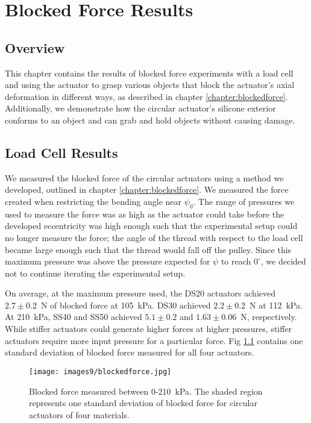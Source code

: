 \chapter{Blocked Force Results}

\section*{Overview}

This chapter contains the results of blocked force experiments with a load cell and using the actuator to grasp various objects that block the actuator's axial deformation in different ways, as described in chapter \ref{chapter:blockedforce}. Additionally, we demonstrate how the circular actuator's silicone exterior conforms to an object and can grab and hold objects without causing damage.

\section{Load Cell Results}

We measured the blocked force of the circular actuators using a method we developed, outlined in chapter \ref{chapter:blockedforce}. We measured the force created when restricting the bending angle near $\psi_0$. The range of pressures we used to measure the force was as high as the actuator could take before the developed eccentricity was high enough such that the experimental setup could no longer measure the force; the angle of the thread with respect to the load cell became large enough such that the thread would fall off the pulley. Since this maximum pressure was above the pressure expected for $\psi$ to reach $0^\circ$, we decided not to continue iterating the experimental setup. 

On average, at the maximum pressure used, the DS20 actuators achieved $2.7\pm0.2$~N of blocked force at 105~kPa. DS30 achieved $2.2\pm0.2$~N at 112~kPa. At 210~kPa, SS40 and SS50 achieved $5.1\pm0.2$ and $1.63\pm0.06$~N, respectively. While stiffer actuators could generate higher forces at higher pressures, stiffer actuators require more input pressure for a particular force. Fig \ref{fig:blockedforce} contains one standard deviation of blocked force measured for all four actuators. 

\begin{figure}[!ht]
    \centering
     \texttt{[image: images9/blockedforce.jpg]}
    \caption{Blocked force measured between 0-210~kPa. The shaded region represents one standard deviation of blocked force for circular actuators of four materials.}
    \label{fig:blockedforce}
\end{figure}

